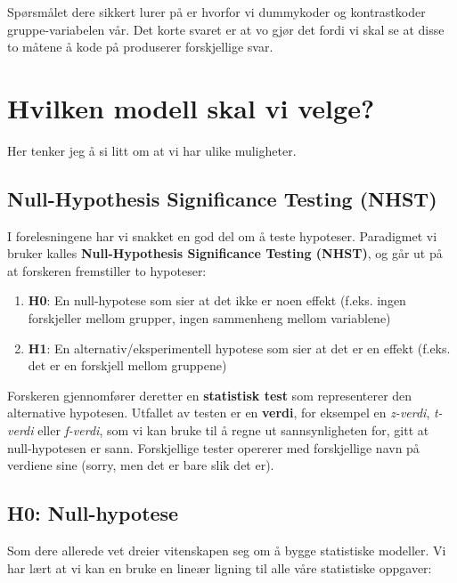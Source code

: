 \documentclass[
]{book}
\providecommand{\tightlist}{%
  \setlength{\itemsep}{0pt}\setlength{\parskip}{0pt}}
\begin{document}
Spørsmålet dere sikkert lurer på er hvorfor vi dummykoder og kontrastkoder gruppe-variabelen vår. Det korte svaret er at vo gjør det fordi vi skal se at disse to måtene å kode på produserer forskjellige svar.

\hypertarget{hvilken-modell-skal-vi-velge}{%
\chapter{Hvilken modell skal vi velge?}\label{hvilken-modell-skal-vi-velge}}

Her tenker jeg å si litt om at vi har ulike muligheter.

\hypertarget{null-hypothesis-significance-testing-nhst}{%
\section{Null-Hypothesis Significance Testing (NHST)}\label{null-hypothesis-significance-testing-nhst}}

I forelesningene har vi snakket en god del om å teste hypoteser. Paradigmet vi bruker kalles \textbf{Null-Hypothesis Significance Testing (NHST)}, og går ut på at forskeren fremstiller to hypoteser:

\begin{enumerate}
\def\labelenumi{\arabic{enumi}.}
\tightlist
\item
  \textbf{H0}: En null-hypotese som sier at det ikke er noen effekt (f.eks. ingen forskjeller mellom grupper, ingen sammenheng mellom variablene)
\item
  \textbf{H1}: En alternativ/eksperimentell hypotese som sier at det er en effekt (f.eks. det er en forskjell mellom gruppene)
\end{enumerate}

Forskeren gjennomfører deretter en \textbf{statistisk test} som representerer den alternative hypotesen. Utfallet av testen er en \textbf{verdi}, for eksempel en \emph{z-verdi}, \emph{t-verdi} eller \emph{f-verdi}, som vi kan bruke til å regne ut sannsynligheten for, gitt at null-hypotesen er sann. Forskjellige tester opererer med forskjellige navn på verdiene sine (sorry, men det er bare slik det er).

\hypertarget{h0-null-hypotese}{%
\section{H0: Null-hypotese}\label{h0-null-hypotese}}

Som dere allerede vet dreier vitenskapen seg om å bygge statistiske modeller. Vi har lært at vi kan en bruke en lineær ligning til alle våre statistiske oppgaver:
\end{document}
